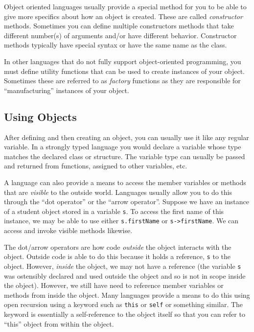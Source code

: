 Object oriented languages usually provide a special method for you to
be able to give more specifics about how an object is created.  These
are called \emph{constructor} methods.  Sometimes you can define 
multiple constructors methods that take different number(s) of arguments
and/or have different behavior.  Constructor methods typically have
special syntax or have the same name as the class.

In other languages that do not fully support object-oriented programming, 
you must define utility functions that can be used to create instances 
of your object.  Sometimes these are referred to as \emph{factory} functions 
as they are responsible for ``manufacturing'' instances of your object.

\subsection{Using Objects}

After defining and then creating an object, you can usually use it like
any regular variable.  In a strongly typed language you would declare a
variable whose type matches the declared class or structure.  The variable
type can usually be passed and returned from functions, assigned to 
other variables, etc.

A language can also provide a means to access the member variables or
methods that are \emph{visible} to the outside world.  Languages usually
allow you to do this through the ``dot operator'' or the ``arrow operator''.
Suppose we have an instance of a student object stored in a variable
\texttt{s}.  To access the first name of this instance, we may
be able to use either \texttt{s.firstName} or 
\texttt{s->firstName}.  We can access and invoke visible methods 
likewise.  

The dot/arrow operators are how code \emph{outside} the object interacts
with the object.  Outside code is able to do this because it holds a 
reference, \texttt{s} to the object.  However, \emph{inside} the
object, we may not have a reference (the variable \texttt{s} was
ostensibly declared and used outside the object and so is not in
scope inside the object).  However, we still have need to reference
member variables or methods from inside the object.  Many languages
provide a means to do this using \gls{open recursion} 
using a keyword such as \texttt{this} or \texttt{self}
or something similar.  The keyword is essentially a self-reference to
the object itself so that you can refer to ``this'' object from within
the object.

